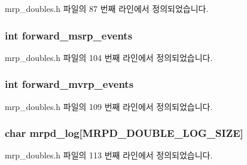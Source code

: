 mrp\+\_\+doubles.\+h 파일의 87 번째 라인에서 정의되었습니다.

\subsubsection[{\texorpdfstring{forward\+\_\+msrp\+\_\+events}{forward_msrp_events}}]{\setlength{\rightskip}{0pt plus 5cm}int forward\+\_\+msrp\+\_\+events}\hypertarget{structmrpd__test__state_a2071b97373847fe6c7ffadbd4a19cdf1}{}\label{structmrpd__test__state_a2071b97373847fe6c7ffadbd4a19cdf1}


mrp\+\_\+doubles.\+h 파일의 104 번째 라인에서 정의되었습니다.

\subsubsection[{\texorpdfstring{forward\+\_\+mvrp\+\_\+events}{forward_mvrp_events}}]{\setlength{\rightskip}{0pt plus 5cm}int forward\+\_\+mvrp\+\_\+events}\hypertarget{structmrpd__test__state_a3d733b955e546c6b00da196f0035a09b}{}\label{structmrpd__test__state_a3d733b955e546c6b00da196f0035a09b}


mrp\+\_\+doubles.\+h 파일의 109 번째 라인에서 정의되었습니다.

\subsubsection[{\texorpdfstring{mrpd\+\_\+log}{mrpd_log}}]{\setlength{\rightskip}{0pt plus 5cm}char mrpd\+\_\+log\mbox{[}{\bf M\+R\+P\+D\+\_\+\+D\+O\+U\+B\+L\+E\+\_\+\+L\+O\+G\+\_\+\+S\+I\+ZE}\mbox{]}}\hypertarget{structmrpd__test__state_a601b9db3c0b4a7a3ab243f0943054263}{}\label{structmrpd__test__state_a601b9db3c0b4a7a3ab243f0943054263}


mrp\+\_\+doubles.\+h 파일의 113 번째 라인에서 정의되었습니다.

